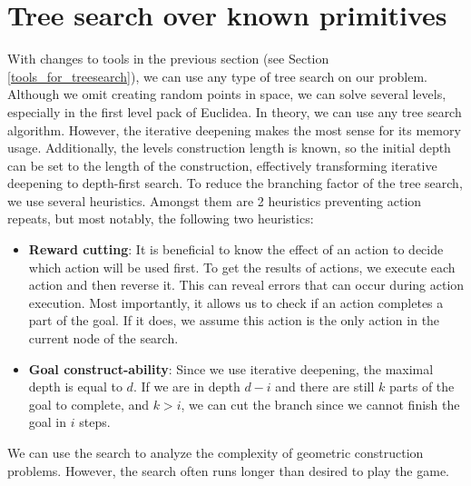 \section{Tree search over known primitives}
\label{tree_seach}
With changes to tools in the previous section (see Section \ref{tools_for_treesearch}), we can use any type of tree search on our problem. Although we omit creating random points in space, we can solve several levels, especially in the first level pack of Euclidea.
\newline \newline
In theory, we can use any tree search algorithm. However, the iterative deepening makes the most sense for its memory usage. Additionally, the levels construction length is known, so the initial depth can be set to the length of the construction, effectively transforming iterative deepening to depth-first search.
\newline \newline
To reduce the branching factor of the tree search, we use several heuristics. Amongst them are 2 heuristics preventing action repeats, but most notably, the following two heuristics:
\begin{itemize}
    \item \textbf{Reward cutting}:  It is beneficial to know the effect of an action to decide which action will be used first. To get the results of actions, we execute each action and then reverse it. This can reveal errors that can occur during action execution. Most importantly, it allows us to check if an action completes a part of the goal. If it does, we assume this action is the only action in the current node of the search.
    \item \textbf{Goal construct-ability}: Since we use iterative deepening, the maximal depth is equal to $d$. If we are in depth $d-i$ and there are still $k$ parts of the goal to complete, and $k > i$, we can cut the branch since we cannot finish the goal in $i$ steps.
\end{itemize}
We can use the search to analyze the complexity of geometric construction problems. However, the search often runs longer than desired to play the game.

